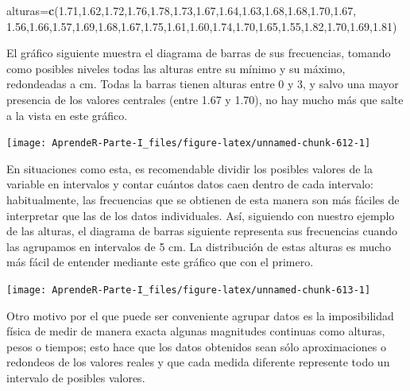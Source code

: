 \documentclass[]{book}
\newenvironment{Shaded}{\begin{snugshade}}{\end{snugshade}}
\newcommand{\FloatTok}[1]{\textcolor[rgb]{0.00,0.00,0.81}{#1}}
\newcommand{\KeywordTok}[1]{\textcolor[rgb]{0.13,0.29,0.53}{\textbf{#1}}}
\newcommand{\NormalTok}[1]{#1}
\theoremstyle{definition}
\theoremstyle{definition}
\theoremstyle{definition}
\theoremstyle{remark}
\begin{document}
\begin{Shaded}
\begin{Highlighting}[]
\NormalTok{alturas=}\KeywordTok{c}\NormalTok{(}\FloatTok{1.71}\NormalTok{,}\FloatTok{1.62}\NormalTok{,}\FloatTok{1.72}\NormalTok{,}\FloatTok{1.76}\NormalTok{,}\FloatTok{1.78}\NormalTok{,}\FloatTok{1.73}\NormalTok{,}\FloatTok{1.67}\NormalTok{,}\FloatTok{1.64}\NormalTok{,}\FloatTok{1.63}\NormalTok{,}\FloatTok{1.68}\NormalTok{,}\FloatTok{1.68}\NormalTok{,}\FloatTok{1.70}\NormalTok{,}\FloatTok{1.67}\NormalTok{,}
  \FloatTok{1.56}\NormalTok{,}\FloatTok{1.66}\NormalTok{,}\FloatTok{1.57}\NormalTok{,}\FloatTok{1.69}\NormalTok{,}\FloatTok{1.68}\NormalTok{,}\FloatTok{1.67}\NormalTok{,}\FloatTok{1.75}\NormalTok{,}\FloatTok{1.61}\NormalTok{,}\FloatTok{1.60}\NormalTok{,}\FloatTok{1.74}\NormalTok{,}\FloatTok{1.70}\NormalTok{,}\FloatTok{1.65}\NormalTok{,}\FloatTok{1.55}\NormalTok{,}\FloatTok{1.82}\NormalTok{,}\FloatTok{1.70}\NormalTok{,}\FloatTok{1.69}\NormalTok{,}\FloatTok{1.81}\NormalTok{)}
\end{Highlighting}
\end{Shaded}

El gráfico siguiente muestra el diagrama de barras de sus frecuencias, tomando como posibles niveles todas las alturas entre su mínimo y su máximo, redondeadas a cm. Todas la barras tienen alturas entre 0 y 3, y salvo una mayor presencia de los valores centrales (entre 1.67 y 1.70), no hay mucho más que salte a la vista en este gráfico.

\begin{center}\texttt{[image: AprendeR-Parte-I\_files/figure-latex/unnamed-chunk-612-1]} \end{center}

En situaciones como esta, es recomendable dividir los posibles valores de la variable en intervalos y contar cuántos datos caen dentro de cada intervalo: habitualmente, las frecuencias que se obtienen de esta manera son más fáciles de interpretar que las de los datos individuales. Así, siguiendo con nuestro ejemplo de las alturas, el diagrama de barras siguiente representa sus frecuencias cuando las agrupamos en intervalos de 5 cm. La distribución de estas alturas es mucho más fácil de entender mediante este gráfico que con el primero.

\begin{center}\texttt{[image: AprendeR-Parte-I\_files/figure-latex/unnamed-chunk-613-1]} \end{center}

Otro motivo por el que puede ser conveniente agrupar datos es la imposibilidad física de medir de manera exacta algunas magnitudes continuas como alturas, pesos o tiempos; esto hace que los datos obtenidos sean sólo aproximaciones o redondeos de los valores reales y que cada medida diferente represente todo un intervalo de posibles valores.
\end{document}
